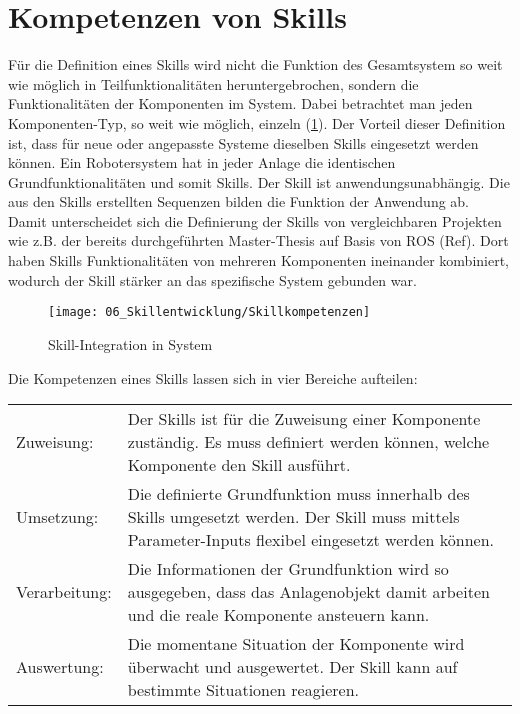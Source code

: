 \section{Kompetenzen von Skills} \label{Skillkompetenzen}
	Für die Definition eines Skills wird nicht die Funktion des Gesamtsystem so weit wie möglich in Teilfunktionalitäten heruntergebrochen, sondern die Funktionalitäten der Komponenten im System. Dabei betrachtet man jeden Komponenten-Typ, so weit wie möglich, einzeln (\ref{fig:Skillintegration}). Der Vorteil dieser Definition ist, dass für neue oder angepasste Systeme dieselben Skills eingesetzt werden können. Ein Robotersystem hat in jeder Anlage die identischen Grundfunktionalitäten und somit Skills. Der Skill ist anwendungsunabhängig. Die aus den Skills erstellten Sequenzen bilden die Funktion der Anwendung ab. Damit unterscheidet sich die Definierung der Skills von vergleichbaren Projekten wie z.B. der bereits durchgeführten Master-Thesis auf Basis von ROS (Ref). Dort haben Skills Funktionalitäten von mehreren Komponenten ineinander kombiniert, wodurch der Skill stärker an das spezifische System gebunden war.
	\begin{figure}[h!]
		\centering
		\texttt{[image: 06\_Skillentwicklung/Skillkompetenzen]}
		\captionsetup{justification=centering}
		\caption{Skill-Integration in System}
		\label{fig:Skillintegration}
	\end{figure}
	
	Die Kompetenzen eines Skills lassen sich in vier Bereiche aufteilen: 
	
	\begin{tabularx}{\textwidth}{@{}>{}p{8em} X@{}}
		Zuweisung: & 
		Der Skills ist für die Zuweisung einer Komponente zuständig. Es muss definiert werden können, welche Komponente den Skill ausführt.
		\\
		Umsetzung: & 
		Die definierte Grundfunktion muss innerhalb des Skills umgesetzt werden. Der Skill muss mittels Parameter-Inputs flexibel eingesetzt werden können.
		\\
		Verarbeitung: & 
		Die Informationen der Grundfunktion wird so ausgegeben, dass das Anlagenobjekt damit arbeiten und die reale Komponente ansteuern kann.
		\\
		Auswertung: & 
		Die momentane Situation der Komponente wird überwacht und ausgewertet. Der Skill kann auf bestimmte Situationen reagieren. 
		\\
	\end{tabularx}
